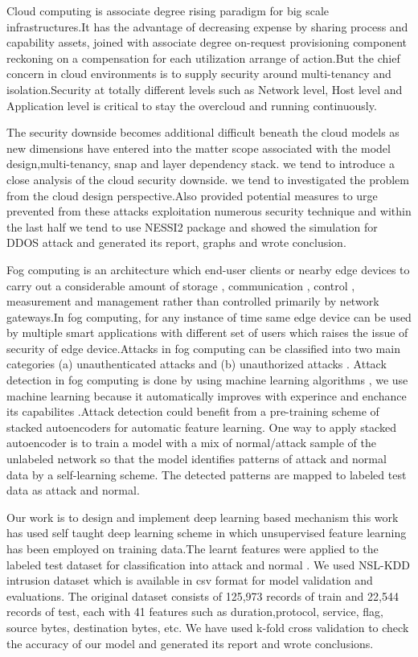 Cloud computing is associate degree rising paradigm for big scale infrastructures.It
has the advantage of decreasing expense by sharing process and capability assets, joined with associate degree on-request provisioning component reckoning on a compensation for each utilization arrange of action.But the chief concern in cloud environments is to supply security around multi-tenancy and isolation.Security at totally different levels such as Network level, Host level and Application level is critical to stay the overcloud and running continuously. 

The security downside becomes additional difficult beneath the cloud models as new
dimensions have entered into the matter scope associated with the model design,multi-tenancy, snap and layer dependency stack. we tend to introduce a close analysis of the cloud security downside. we tend to investigated the problem from the cloud design perspective.Also provided potential measures to urge prevented from
these attacks exploitation numerous security technique and within the last half we
tend to use NESSI2 package and showed the simulation for DDOS attack and generated its report, graphs and wrote conclusion.

Fog computing is an architecture which end-user clients or nearby edge devices to carry out a considerable amount of storage , communication
, control , measurement and management rather than controlled primarily by network gateways.In fog computing, for any instance of time same
edge device can be used by multiple smart applications with different set of users which raises the issue of security of edge device.Attacks in fog computing
can be classified into two main categories (a) unauthenticated attacks and (b) unauthorized attacks . Attack detection in fog computing is done by using 
machine learning algorithms , we use machine learning because it automatically improves with experince and enchance its capabilites .Attack detection could benefit from a
pre-training scheme of stacked autoencoders for automatic feature learning. One way to apply stacked
autoencoder is to train a model with a mix of normal/attack sample of the unlabeled network so that the
model identifies patterns of attack and normal data by a self-learning scheme. The detected patterns are
mapped to labeled test data as attack and normal.

Our work is to design and implement deep learning based mechanism this work has used self taught deep learning scheme in which unsupervised feature learning has
been employed on training data.The learnt features were applied to the labeled test dataset for classification into attack and normal .
We used NSL-KDD intrusion dataset which is available in csv format for model validation and
evaluations. The original dataset consists of 125,973 records of train and 22,544 records of test, each
with 41 features such as duration,protocol, service, flag, source bytes, destination bytes, etc.
We have used k-fold cross validation to check the accuracy of our model and generated its report and wrote conclusions. 

